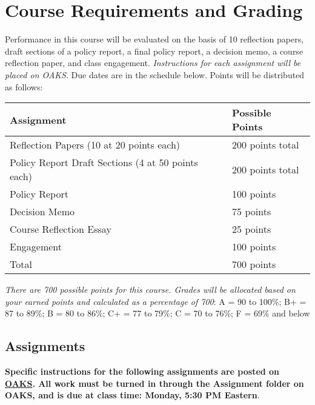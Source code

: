 \hypertarget{course-requirements-and-grading}{%
\section{Course Requirements and
Grading}\label{course-requirements-and-grading}}

Performance in this course will be evaluated on the basis of 10
reflection papers, draft sections of a policy report, a final policy
report, a decision memo, a course reflection paper, and class
engagement. \emph{Instructions for each assignment will be placed on
OAKS}. Due dates are in the schedule below. Points will be distributed
as follows:

\vspace{0.10in}
\begin{tabular}{ l l}
\hline
Assignment & Possible Points \\
\hline 
Reflection Papers (10 at 20 points each) & 200 points total \\
Policy Report Draft Sections (4 at 50 points each) & 200 points total \\ 
Policy Report & 100 points \\
Decision Memo & 75 points \\
Course Reflection Essay & 25 points \\
Engagement & 100 points \\ 
\hline
Total & 700 points \\
\hline
\end{tabular}

\vspace{0.10in}

\noindent \emph{There are 700 possible points for this course. Grades
will be allocated based on your earned points and calculated as a
percentage of 700}: A = 90 to 100\%; B+ = 87 to 89\%; B = 80 to 86\%; C+
= 77 to 79\%; C = 70 to 76\%; F = 69\% and below

\hypertarget{assignments}{%
\subsection{Assignments}\label{assignments}}

\textbf{Specific instructions for the following assignments are posted
on \href{https://lms.cofc.edu/d2l/home}{OAKS}. All work must be turned
in through the Assignment folder on OAKS, and is due at class time:
Monday, 5:30 PM Eastern}.

